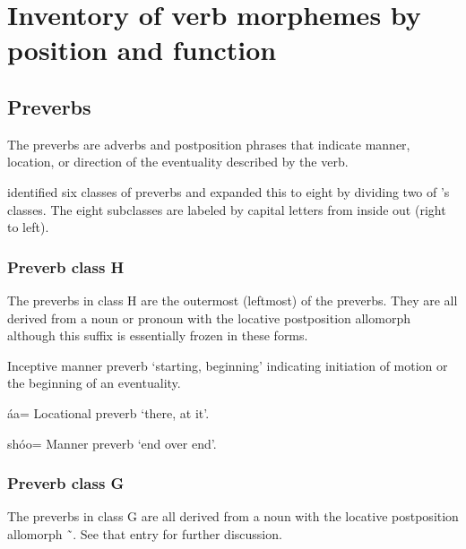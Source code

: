 
\section{Inventory of verb morphemes by position and function}\label{sec:inventory}

\subsection{Preverbs}\label{sec:inventory-preverb}

The preverbs are adverbs and postposition phrases that indicate manner, location, or direction
	of the eventuality described by the verb.

\textcite[132–134]{leer:1991} identified six classes of preverbs and \textcite[686]{crippen:2019} expanded this to eight by dividing two of \citeauthor{leer:1991}’s classes.
The eight subclasses are labeled by capital letters from inside out (right to left).

\subsubsection{Preverb class H}\label{sec:inventory-preverb-H}

The preverbs in class H are the outermost (leftmost) of the preverbs.
They are all derived from a noun or pronoun with the locative postposition allomorph 
	although this suffix is essentially frozen in these forms.

\begin{morphdesc}
\item[\X{g̱unayéi=}]
\item[\X{g̱unéi=}]
\item[\X{g̱unyéi=}]
	Inceptive manner preverb ‘starting, beginning’ indicating initiation of motion
	or the beginning of an eventuality.

\item[áa=]
	Locational preverb ‘there, at it’.

\item[shóo=]
	Manner preverb ‘end over end’.
\end{morphdesc}

\subsubsection{Preverb class G}\label{sec:inventory-preverb-G}

The preverbs in class G are all derived from a noun
	with the locative postposition allomorph  \~\ .
See that entry for further discussion.

